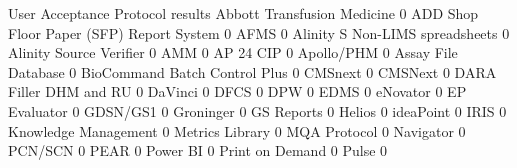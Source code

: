\documentclass{article}
\begin{document}
\begin{Schunk}
\begin{Soutput}
                                           User Acceptance Protocol results
  Abbott Transfusion Medicine                                             0
  ADD Shop Floor Paper (SFP) Report System                                0
  AFMS                                                                    0
  Alinity S Non-LIMS spreadsheets                                         0
  Alinity Source Verifier                                                 0
  AMM                                                                     0
  AP 24 CIP                                                               0
  Apollo/PHM                                                              0
  Assay File Database                                                     0
  BioCommand Batch Control Plus                                           0
  CMSnext                                                                 0
  CMSNext                                                                 0
  DARA Filler DHM and RU                                                  0
  DaVinci                                                                 0
  DFCS                                                                    0
  DPW                                                                     0
  EDMS                                                                    0
  eNovator                                                                0
  EP Evaluator                                                            0
  GDSN/GS1                                                                0
  Groninger                                                               0
  GS Reports                                                              0
  Helios                                                                  0
  ideaPoint                                                               0
  IRIS                                                                    0
  Knowledge Management                                                    0
  Metrics Library                                                         0
  MQA Protocol                                                            0
  Navigator                                                               0
  PCN/SCN                                                                 0
  PEAR                                                                    0
  Power BI                                                                0
  Print on Demand                                                         0
  Pulse                                                                   0

\end{Soutput}
\end{Schunk}
\end{document}
